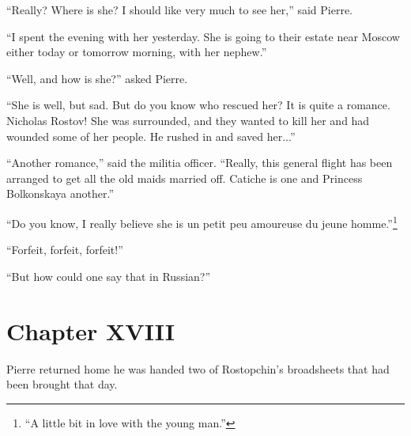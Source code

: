 ``Really? Where is she? I should like very much to see her,''
said Pierre.

``I spent the evening with her yesterday. She is going to their
estate near Moscow either today or tomorrow morning, with her
nephew.''

``Well, and how is she?'' asked Pierre.

``She is well, but sad. But do you know who rescued her? It is
quite a romance. Nicholas Rostov! She was surrounded, and they
wanted to kill her and had wounded some of her people. He rushed
in and saved her...''

``Another romance,'' said the militia officer. ``Really, this
general flight has been arranged to get all the old maids married
off. Catiche is one and Princess Bolkonskaya another.''

``Do you know, I really believe she is un petit peu amoureuse du
jeune homme.''\footnote{``A little bit in love with the young
man.''}

``Forfeit, forfeit, forfeit!''

``But how could one say that in Russian?''


\chapter*{Chapter XVIII} \ifaudio {}
\fi

 Pierre returned home he was handed two of Rostopchin's
broadsheets that had been brought that day.

